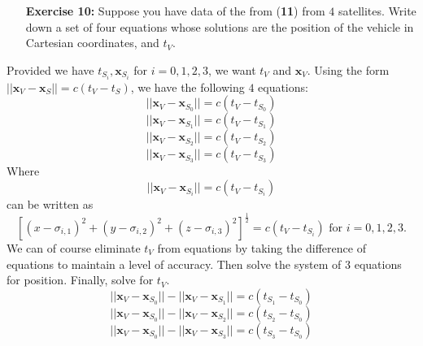 \documentclass[11pt]{article}
\theoremstyle{definition}
\newcommand{\1}[1]{\mathbf{1} \left \{ #1 \right \}}
\begin{document}
\begin{itemize}
\item[{\textbf{Exercise 10:}}] Suppose you have data of the from (\textbf{11}) from $4$ satellites.  Write down a set of four equations whose solutions are the position of the vehicle in Cartesian coordinates, and $t_V$.
\end{itemize}
Provided we have $t_{S_i}, \textbf{x}_{S_i}$ for $i = 0,1,2,3$, we want $t_V$ and $\textbf{x}_V$.  Using the form \(||\textbf{x}_V - \textbf{x}_S|| = c(t_V - t_S)\), we have the following $4$ equations:
\begin{equation}
    ||\textbf{x}_V - \textbf{x}_{S_0}|| = c(t_V - t_{S_0})
\end{equation}
\begin{equation}
    ||\textbf{x}_V - \textbf{x}_{S_1}|| = c(t_V - t_{S_1})
\end{equation}
\begin{equation}
    ||\textbf{x}_V - \textbf{x}_{S_2}|| = c(t_V - t_{S_2})
\end{equation}
\begin{equation}
    ||\textbf{x}_V - \textbf{x}_{S_3}|| = c(t_V - t_{S_3})
\end{equation}
Where
\begin{equation}
    ||\textbf{x}_V - \textbf{x}_{S_i}|| = c(t_V - t_{S_i})
\end{equation} can be written as
\begin{equation}
    \left[\left(x - \sigma_{i,1}\right)^2 + \left(y - \sigma_{i,2}\right)^2 + \left(z - \sigma_{i,3}\right)^2\right]^{\frac{1}{2}} = c(t_V - t_{S_i}) \text{ for } i = 0,1,2,3.
\end{equation}
We can of course eliminate $t_V$ from equations by taking the difference of equations to maintain a level of accuracy.  Then solve the system of 3 equations for position.  Finally, solve for $t_V$.
\begin{equation}
    ||\textbf{x}_V - \textbf{x}_{S_0}|| - ||\textbf{x}_V - \textbf{x}_{S_1}|| = c(t_{S_1} - t_{S_0})
\end{equation}
\begin{equation}
    ||\textbf{x}_V - \textbf{x}_{S_0}|| - ||\textbf{x}_V - \textbf{x}_{S_2}|| = c(t_{S_2} - t_{S_0})
\end{equation}
\begin{equation}
    ||\textbf{x}_V - \textbf{x}_{S_0}|| - ||\textbf{x}_V - \textbf{x}_{S_3}|| = c(t_{S_3} - t_{S_0})
\end{equation}
\end{document}
